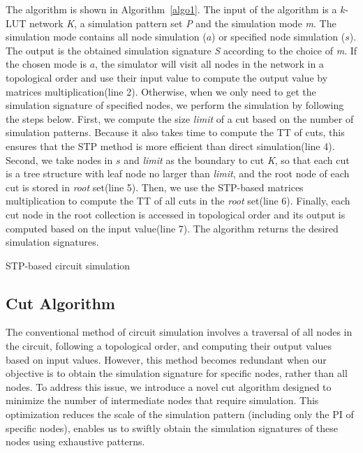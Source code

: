 \documentclass[conference]{IEEEtran}
\begin{document}
The algorithm is shown in Algorithm~\ref{algo1}.
The input of the algorithm is a $k$-LUT network \emph{K}, a simulation pattern set \emph{P} and the simulation mode \emph{m}.
The simulation mode contains all node simulation ($a$) or specified node simulation ($s$).
The output is the obtained simulation signature \emph{S} according to the choice of \emph{m}.
If the chosen mode is $a$, the simulator will visit all nodes in the network in a topological order and use their input value to compute the output value by matrices multiplication(line 2).
Otherwise, when we only need to get the simulation signature of specified nodes, we perform the simulation by following the steps below.
First, we compute the size \emph{limit} of a cut based on the number of simulation patterns.
Because it also takes time to compute the TT of cuts, this ensures that the STP method is more efficient than direct simulation(line 4).
Second, we take nodes in $s$ and \emph{limit} as the boundary to cut \emph{K}, so that each cut is a tree structure with leaf node no larger than \emph{limit}, and the root node of each cut is stored in \emph{root} set(line 5).
Then, we use the STP-based matrices multiplication to compute the TT of all cuts in the \emph{root} set(line 6).
Finally, each cut node in the root collection is accessed in topological order and its output is computed based on the input value(line 7).
The algorithm returns the desired simulation signatures.

\begin{algorithm}[t]\footnotesize
  \SetAlgoLined
  \LinesNumbered %
  \caption{STP-based circuit simulation}
  \label{algo1}
\end{algorithm}

\subsection{Cut Algorithm}
\label{sec33}
The conventional method of circuit simulation involves a traversal of all nodes in the circuit, following a topological order, and computing their output values based on input values. 
However, this method becomes redundant when our objective is to obtain the simulation signature for specific nodes, rather than all nodes.
To address this issue, we introduce a novel cut algorithm designed to minimize the number of intermediate nodes that require simulation. 
This optimization reduces the scale of the simulation pattern (including only the PI of specific nodes), enables us to swiftly obtain the simulation signatures of these nodes using exhaustive patterns.
\end{document}
